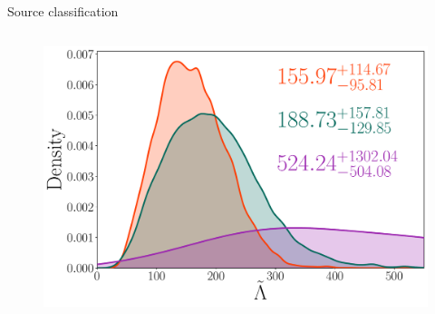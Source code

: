 \documentclass[usenames,dvipsnames,t]{beamer}
\begin{document}
\begin{frame}{Source classification}
\begin{columns}[T]
{    \vspace{\y}

    \begin{figure}
      \centering
      \includegraphics[width=0.95\linewidth]{Figures/GW190425.pdf}
    \end{figure}
    }

  \end{columns}
\end{frame}
\end{document}
